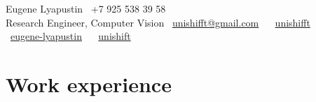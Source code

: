 \documentclass{tccv}
\begin{document}
{ Eugene Lyapustin} \hfill \faPhone~+7 925 538 39 58 \\%
{\Large Research Engineer, Computer Vision} \hfill \faEnvelope~\href{mailto:unishifft@gmail.com}{unishifft@gmail.com} ~ \faTelegramPlane~\href{https://t.me/unishifft}{unishifft}\\
\null\hfill \faLinkedin~\href{https://linkedin.com/in/eugene-lyapustin}{eugene-lyapustin} ~ \faGithub~\href{https://github.com/unishift/}{unishift}



\section{Work experience}
\end{document}
